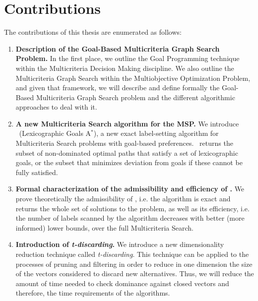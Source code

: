 \section{Contributions}
\label{ChapIntroduction:sec:contributions}
 
The contributions of this thesis are enumerated as follows: 

\begin{enumerate}
	\item \textbf{Description of the Goal-Based Multicriteria Graph Search Problem.} In the first place, we outline the Goal Programming technique within the Multicriteria Decision Making discipline. We also outline the Multicriteria Graph Search within the Multiobjective Optimization Problem, and given that framework, we will describe and define formally the Goal-Based Multicriteria Graph Search problem and the different algorithmic approaches to deal with it.  

	\item \textbf{A new Multicriteria Search algorithm for the MSP.} We introduce \lexgo \ (Lexicographic Goals A$^*$), a new exact label-setting algorithm for Multicriteria Search problems with goal-based preferences. \lexgo \ returns the subset of non-dominated optimal paths that satisfy a set of lexicographic goals, or the subset that minimizes deviation from goals if these cannot be fully satisfied.

	\item \textbf{Formal characterization of the admissibility and efficiency of \lexgo.} We prove theoretically the admissibility of \lexgo, i.e. the algorithm is exact and returns the whole set of solutions to the problem, as well as its efficiency, i.e. the number of labels scanned by the algorithm decreases with better (more informed) lower bounds, over the full Multicriteria Search.

	\item \textbf{Introduction of \emph{t-discarding}.} We introduce a new dimensionality reduction technique called \emph{t-discarding}. This technique can be applied to the processes of pruning and filtering in order to reduce in one dimension the size of the vectors considered to discard new alternatives. Thus, we will reduce the amount of time needed to check dominance against closed vectors and therefore, the time requirements of the algorithms.


\end{enumerate}
